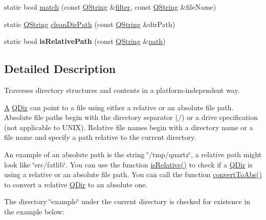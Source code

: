 \begin{DoxyCompactItemize}
\item 
static bool \mbox{\hyperlink{class_q_dir_a72a73a1e4d9bf42ec4307a70605b77b9}{match}} (const \mbox{\hyperlink{class_q_string}{Q\+String}} \&\mbox{\hyperlink{class_q_dir_a55b8ed62e97891ffc50d0c4a2b8fe31d}{filter}}, const \mbox{\hyperlink{class_q_string}{Q\+String}} \&file\+Name)
\item 
static \mbox{\hyperlink{class_q_string}{Q\+String}} \mbox{\hyperlink{class_q_dir_ad38037708dc754f5bdd877c145dbbb19}{clean\+Dir\+Path}} (const \mbox{\hyperlink{class_q_string}{Q\+String}} \&dir\+Path)
\item 
\mbox{\label{class_q_dir_a500524767f07a8cf127392859cc41d49}} 
static bool {\bfseries is\+Relative\+Path} (const \mbox{\hyperlink{class_q_string}{Q\+String}} \&\mbox{\hyperlink{class_q_dir_a6258e0803c991909e0ce38e40f6f07ec}{path}})
\end{DoxyCompactItemize}


\subsection{Detailed Description}
Traverses directory structures and contents in a platform-\/independent way. 

\mbox{\hyperlink{class_a}{A}} \mbox{\hyperlink{class_q_dir}{Q\+Dir}} can point to a file using either a relative or an absolute file path. Absolute file paths begin with the directory separator (\textquotesingle{}/\textquotesingle{}) or a drive specification (not applicable to U\+N\+IX). Relative file names begin with a directory name or a file name and specify a path relative to the current directory.

An example of an absolute path is the string \char`\"{}/tmp/quartz\char`\"{}, a relative path might look like \char`\"{}src/fatlib\char`\"{}. You can use the function \mbox{\hyperlink{class_q_dir_a2b420c4c2e7b5764ab1fb35e37d1726f}{is\+Relative()}} to check if a \mbox{\hyperlink{class_q_dir}{Q\+Dir}} is using a relative or an absolute file path. You can call the function \mbox{\hyperlink{class_q_dir_a0c05c8978b3b4158233f809e4d30c55d}{convert\+To\+Abs()}} to convert a relative \mbox{\hyperlink{class_q_dir}{Q\+Dir}} to an absolute one.

The directory \char`\"{}example\char`\"{} under the current directory is checked for existence in the example below\+:


\begin{DoxyCode}{0}
\end{DoxyCode}


